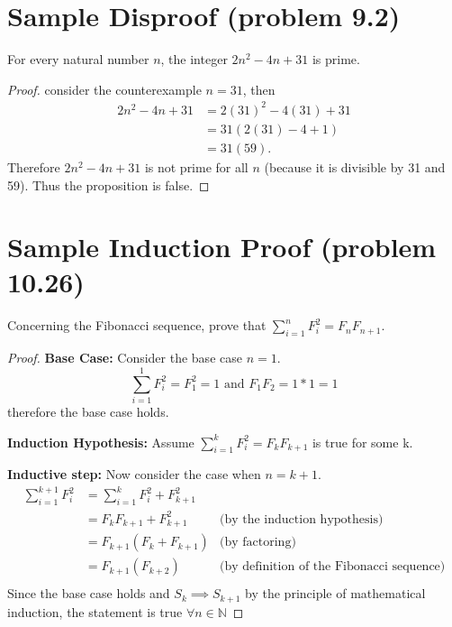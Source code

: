 \documentclass{article}
\newcommand{\N}{\mathbb{N}}
\begin{document}
	\section*{Sample Disproof (problem 9.2)}
	
	For every natural number $n$, the integer $2n^2-4n+31$ is prime.
	\begin{proof}
		consider the counterexample $n = 31 $, then 
		\begin{align*}
			2n^2-4n+31 &= 2(31)^2-4(31)+31\\
			&= 31(2(31)-4+1)\\
			&= 31(59).
		\end{align*}
		Therefore $2n^2-4n+31$ is not prime for all $n$ (because it is divisible by 31 and 59). Thus the proposition is 	false.
	\end{proof}
	
	\section*{Sample Induction Proof (problem 10.26)}
	 Concerning the Fibonacci sequence, prove that 
	$\displaystyle\sum_{i=1}^{n}F_i^2= F_n F_{n+1}$.
	\begin{proof}
		\textbf{Base Case:} 
		Consider the base case $n=1$.
		$$ \displaystyle\sum_{i=1}^{1}F_i^2=F_1^2 = 1 \text{ and } F_{1}F_{2} = 1*1 =1 $$
		therefore the base case holds.
		
		\textbf{Induction Hypothesis:} Assume $\displaystyle\sum_{i=1}^{k}F_i^2= F_k F_{k+1}$ is true for some k.
		
		\textbf{Inductive step:} Now consider the case when $n=k+1$.
		\begin{align*}
			\sum_{i=1}^{k+1}F_i^2 &= \sum_{i=1}^{k}F_i^2 + F_{k+1}^2\\
			&= F_k F_{k+1} + F_{k+1}^2 & \text{(by the induction hypothesis)}\\
			&= F_{k+1}(F_k  + F_{k+1}) & \text{(by factoring)}\\
			&= F_{k+1}(F_{k+2}) & \text{(by definition of the Fibonacci sequence)}\\
		\end{align*}
		Since the base case holds and $S_k \implies S_{k+1}$ 
		by the principle of mathematical induction, the statement is true $\forall n \in \N$
	\end{proof}
	
\end{document}
